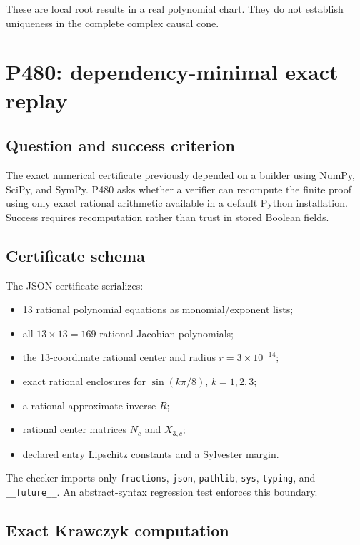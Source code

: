 \documentclass[11pt,a4paper,openany]{report}
\begin{document}
These are local root results in a real polynomial chart. They do not establish
uniqueness in the complete complex causal cone.

\chapter{P480: dependency-minimal exact replay}

\section{Question and success criterion}

The exact numerical certificate previously depended on a builder using
NumPy, SciPy, and SymPy. P480 asks whether a verifier can recompute the finite
proof using only exact rational arithmetic available in a default Python
installation. Success requires recomputation rather than trust in stored
Boolean fields.

\section{Certificate schema}

The JSON certificate serializes:
\begin{itemize}
\item 13 rational polynomial equations as monomial/exponent lists;
\item all \(13\times13=169\) rational Jacobian polynomials;
\item the 13-coordinate rational center and radius
      \(r=3\times10^{-14}\);
\item exact rational enclosures for \(\sin(k\pi/8)\), \(k=1,2,3\);
\item a rational approximate inverse \(R\);
\item rational center matrices \(N_c\) and \(X_{3,c}\);
\item declared entry Lipschitz constants and a Sylvester margin.
\end{itemize}

The checker imports only \texttt{fractions}, \texttt{json},
\texttt{pathlib}, \texttt{sys}, \texttt{typing}, and
\texttt{\_\_future\_\_}. An abstract-syntax regression test enforces this
boundary.

\section{Exact Krawczyk computation}
\end{document}
